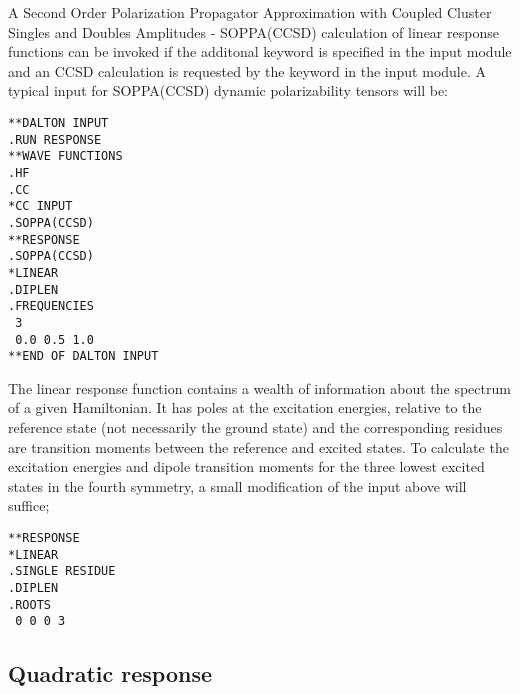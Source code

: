 A Second Order Polarization Propagator Approximation with Coupled Cluster
Singles and Doubles Amplitudes - SOPPA(CCSD)\cite{soppaccsd}
calculation of linear response functions can be invoked if the additonal 
keyword  is specified in the 
 input module and an CCSD calculation is requested by the 
keyword  in the  input module.  A typical input 
for SOPPA(CCSD) dynamic polarizability tensors  will be:
\begin{verbatim}
**DALTON INPUT
.RUN RESPONSE
**WAVE FUNCTIONS
.HF
.CC
*CC INPUT
.SOPPA(CCSD)
**RESPONSE
.SOPPA(CCSD)
*LINEAR
.DIPLEN
.FREQUENCIES
 3
 0.0 0.5 1.0
**END OF DALTON INPUT
\end{verbatim}

The linear response function contains a wealth of
information about the spectrum of a given Hamiltonian. 
It has poles at the excitation
energies, 
relative to the reference state (not necessarily the ground state) and the
corresponding residues are transition
moments between the reference and
excited states. To calculate the excitation energies and dipole transition 
moments for the three lowest excited states
in the fourth symmetry, a small 
modification of the input above will suffice;
\begin{verbatim}
**RESPONSE
*LINEAR
.SINGLE RESIDUE
.DIPLEN
.ROOTS
 0 0 0 3
\end{verbatim}

\subsection{Quadratic response}
\label{subsec:quadrsp}

\begin{center}
\end{center}

